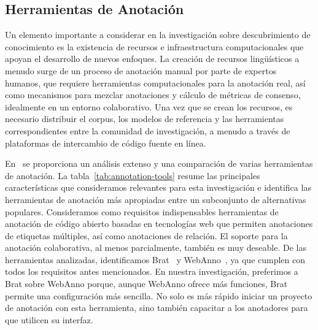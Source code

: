 \subsection{Herramientas de Anotación}

Un elemento importante a considerar en la investigación sobre descubrimiento de conocimiento es la existencia de recursos e infraestructura computacionales que apoyan el desarrollo de nuevos enfoques.
La creación de recursos lingüísticos a menudo surge de un proceso de anotación manual por parte de expertos humanos, que requiere herramientas computacionales para la anotación real, así como mecanismos para mezclar anotaciones y cálculo de métricas de consenso, idealmente en un entorno colaborativo.
Una vez que se crean los recursos, es necesario distribuir el corpus, los modelos de referencia y las herramientas correspondientes entre la comunidad de investigación, a menudo a través de plataformas de intercambio de código fuente en línea.

En~\citet{annotation-tools} se proporciona un análisis extenso y una comparación de varias herramientas de anotación.
La tabla~\ref{tab:annotation-tools} resume las principales características que consideramos relevantes para esta investigación e identifica las herramientas de anotación más apropiadas entre un subconjunto de alternativas populares.
Consideramos como requisitos indispensables herramientas de anotación de código abierto basadas en tecnologías web que permiten anotaciones de etiquetas múltiples, así como anotaciones de relación.
El soporte para la anotación colaborativa, al menos parcialmente, también es muy deseable.
De las herramientas analizadas, identificamos Brat~\cite{brat} y WebAnno~\cite{webanno}, ya que cumplen con todos los requisitos antes mencionados.
En nuestra investigación, preferimos a Brat sobre WebAnno porque, aunque WebAnno ofrece más funciones, Brat permite una configuración más sencilla.
No solo es más rápido iniciar un proyecto de anotación con esta herramienta, sino también capacitar a los anotadores para que utilicen su interfaz.

